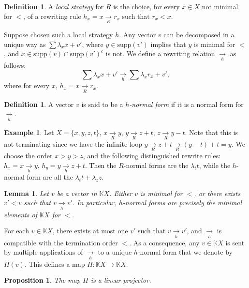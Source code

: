 \documentclass[10pt]{easychair}
\newtheorem{lemma}[theorem]{Lemma}
\newtheorem{proposition}[theorem]{Proposition}
\theoremstyle{definition}
\newtheorem{definition}[theorem]{Definition}
\newtheorem{example}[theorem]{Example}
\newcommand\K{\mathbb{K}}
\newcommand\KX{\K X}
\newcommand\supp{\text{supp}}
\newcommand\rewR{\underset{R}{\longrightarrow}}
\newcommand\rewh{\underset{h}{\longrightarrow}}
\begin{document}
\begin{definition}
A \emph{local strategy} for $R$ is the choice, for every $x\in X$ not minimal for $<$, of a rewriting rule $h_x=x \rewR r_x$ such that $r_x < x$.
\end{definition}

Suppose chosen such a local strategy $h$. 
Any vector $v$ can be decomposed in a unique way as
$\sum\lambda_xx+v'$, where $y\in\supp(v')$ implies that $y$ is minimal
for $<$, and $x\in\supp(v)\cap\supp(v')^c$ is not. We define a rewriting
relation $\rewh$ as follows:
\begin{equation}\label{equ:well-formed_rewriting_step}
  \sum\lambda_xx+v'\rewh\sum\lambda_xr_x+v',
\end{equation}
where for every $x$, $h_x=x \rewR r_x$.

\medskip

\begin{definition}
  A vector $v$ is said to be a \emph{$h$-normal form} if it is a normal
  form for $\rewh$.
\end{definition}


\begin{example}\label{ex:h_norma_form}
Let $X=\{x,y,z,t\}$, $x\rewR y$, $y \rewR z + t$, $z \rewR y - t$. Note that this is not terminating since we have the infinite loop $y \rewR z + t \rewR (y - t) + t = y$. We choose the order $x > y > z$, and the following distinguished rewrite rules: $h_x = x \rewh y$, $h_y = y \rewh z + t$. Then the $R$-normal forms are the $\lambda_t t$, while the $h$-normal form are all the $\lambda_t t + \lambda_z z$.
\end{example}


\begin{lemma}\label{lem:h_normal_forms}
  Let $v$ be a vector in $\KX$. Either $v$ is minimal for $<$, or there exists $v'<v$ such that $v\rewh v'$. In particular, $h$-normal forms are
  precisely the minimal elements of $\KX$ for $<$. 
\end{lemma}

\medskip

For each $v\in\KX$, there exists at most one $v'$ such that $v \rewh v'$,
and $\rewh$ is compatible with the termination order $<$. As a
consequence, any $v \in \KX$ is sent by multiple applications of $\rewh$
to a unique $h$-normal form that we denote by $H(v)$. This defines a map
$H : \KX \to \KX$.  

\begin{proposition}\label{prop:linearity_of_H}
  The map $H$ is a linear projector.
\end{proposition}
\end{document}
